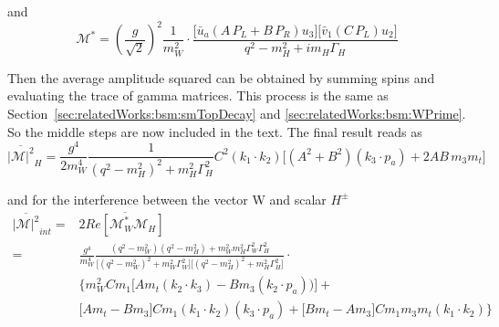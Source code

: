 \noindent and
\begin{equation}
	\mathcal{M}^*  =  (\frac{g }{\sqrt{2}})^2 \frac{1}{m^2_W}  \cdot 
    \frac{ \big[ \bar{u}_a  (A \, P_L + B  \, P_R) u_3 \big] \big[ \bar{v}_1 ( C  \, P_L) u_2 \big]  }{q^2-m^2_{H} + i m_{H} \Gamma_{H}} 
\end{equation}

\noindent Then the average amplitude squared can be obtained by summing spins and evaluating the trace of gamma matrices. This process is the same as Section~\ref{sec:relatedWorks:bsm:smTopDecay} and \ref{sec:relatedWorks:bsm:WPrime}. So the middle steps are now included in the text. The final result reads as
\begin{equation}
	\overline{ |\mathcal{M}|^2 }_{H} = \frac{g^4}{2 m^4_W} \frac{1}{ (q^2-m^2_{H})^2 +  m^2_{H} \Gamma^2_{H}} 
    C^2 (k_1 \cdot k_2) \bigg[ (A^2 + B^2) (k_3 \cdot p_a ) + 2 AB \, m_3  m_t\bigg]
\end{equation}


\noindent and for the interference between the vector W and scalar $H^\pm$ 
\begin{equation}
\begin{split}
    \overline{ |\mathcal{M}|^2 } _{int} = &   2 \overline{ Re[\mathcal{M}^*_W \mathcal{M}_{H}] }  \\
    =& \frac{g ^4}{m_W^4} \frac
    {( q^2-m^2_{W}) ( q^2-m^2_{H}) + m^2_{W}  m^2_{H}  \Gamma^2_{W} \Gamma^2_H }
    { \big[ ( q^2-m^2_{W})^2 +  m^2_{W} \Gamma^2_{W} \big] \big[ (  q^2-m^2_{H})^2 +  m^2_{H} \Gamma^2_{H} \big] }  \cdot \\
    & \bigg\{
    m_W^2  C m_1 \big[A  m_t (k_2 \cdot k_3) - B m_3 (k_2 \cdot p_a) ) \big] + \\
    & \big[A m_t - B m_3 \big] C m_1  (k_1 \cdot k_2) (k_3 \cdot p_a)   +  \big[B m_t - A m_3\big]  C m_1 m_3  m_t (k_1 \cdot k_2)  
    \bigg\}
\end{split}
\end{equation}


